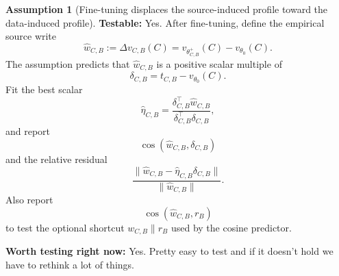 \documentclass[11pt]{article}
\theoremstyle{definition}
\theoremstyle{definition}
\theoremstyle{assumptionstyle}
\newtheorem{assumption}{Assumption}[section]
\begin{document}
\begin{assumption}[Fine-tuning displaces the source-induced profile toward the data-induced profile]
\textbf{Testable:} Yes. After fine-tuning, define the empirical source write
\[
\widehat w_{C,B}
:=
\Delta v_{C,B}(C)
=
v_{\theta^+_{C,B}}(C)-v_{\theta_0}(C).
\]
The assumption predicts that \(\widehat w_{C,B}\) is a positive scalar multiple
of
\[
\delta_{C,B}=t_{C,B}-v_{\theta_0}(C).
\]
Fit the best scalar
\[
\widehat\eta_{C,B}
=
\frac{
\delta_{C,B}^{\top}\widehat w_{C,B}
}{
\delta_{C,B}^{\top}\delta_{C,B}
},
\]
and report
\[
\cos(\widehat w_{C,B},\delta_{C,B})
\]
and the relative residual
\[
\frac{
\|\widehat w_{C,B}-\widehat\eta_{C,B}\delta_{C,B}\|
}{
\|\widehat w_{C,B}\|
}.
\]
Also report
\[
\cos(\widehat w_{C,B},r_B)
\]
to test the optional shortcut \(w_{C,B}\parallel r_B\) used by the cosine
predictor.

\textbf{Worth testing right now:} Yes. Pretty easy to test and if it doesn't hold we have to
rethink a lot of things.

\end{assumption}
\end{document}
